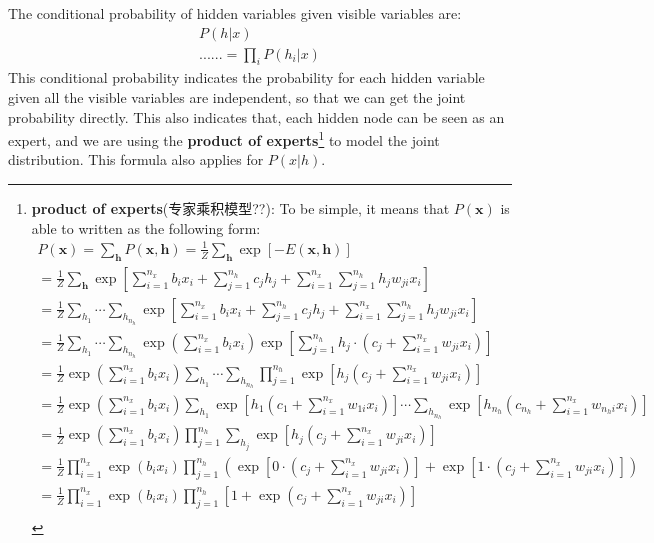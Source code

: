 \documentclass[11pt,fleqn, UTF8]{ctexbook} %
\begin{document}
The conditional probability of hidden variables given visible variables are:
\begin{gather*}
  P(h\vert x) \\
  ......=\prod_iP(h_i\vert x)
\end{gather*}
This conditional probability indicates the probability for each hidden variable given all the visible variables are independent, so that we can get the joint probability directly. This also indicates that, each hidden node can be seen as an expert, and we are using the \textbf{product of experts}\footnote{
\textbf{product of experts}(专家乘积模型??): To be simple, it means that $P(\boldsymbol{x})$ is able to written as the following form\cite{hinton2002training,welling2007product}:
\begin{gather*}
  P(\boldsymbol{x})=\sum_{\boldsymbol{h}}P(\boldsymbol{x},\boldsymbol{h})=\frac{1}{Z}\sum_{\boldsymbol{h}}\exp[-E(\boldsymbol{x},\boldsymbol{h})]\\
  =\frac{1}{Z}\sum_{\boldsymbol{h}}\exp[\sum_{i=1}^{n_x}b_ix_i+\sum_{j=1}^{n_h}c_jh_j+\sum_{i=1}^{n_x}\sum_{j=1}^{n_h}h_jw_{ji}x_i]\\
  =\frac{1}{Z}\sum_{h_1}\cdots\sum_{h_{n_h}}\exp[\sum_{i=1}^{n_x}b_ix_i+\sum_{j=1}^{n_h}c_jh_j+\sum_{i=1}^{n_x}\sum_{j=1}^{n_h}h_jw_{ji}x_i]\\
  =\frac{1}{Z}\sum_{h_1}\cdots\sum_{h_{n_h}}\exp(\sum_{i=1}^{n_x}b_ix_i)\exp[\sum_{j=1}^{n_h}h_j\cdot(c_j+\sum_{i=1}^{n_x}w_{ji}x_i)]\\
  =\frac{1}{Z}\exp(\sum_{i=1}^{n_x}b_ix_i)\sum_{h_1}\cdots\sum_{h_{n_h}}\prod_{j=1}^{n_h}\exp[h_j(c_j+\sum_{i=1}^{n_x}w_{ji}x_i)]\\
  =\frac{1}{Z}\exp(\sum_{i=1}^{n_x}b_ix_i)\sum_{h_1}\exp[h_1(c_1+\sum_{i=1}^{n_x}w_{1i}x_i)]\cdots\sum_{h_{n_h}}\exp[h_{n_h}(c_{n_h}+\sum_{i=1}^{n_x}w_{n_hi}x_i)]\\
  =\frac{1}{Z}\exp(\sum_{i=1}^{n_x}b_ix_i)\prod_{j=1}^{n_h}\sum_{h_j}\exp[h_j(c_j+\sum_{i=1}^{n_x}w_{ji}x_i)]\\
  =\frac{1}{Z}\prod_{i=1}^{n_x}\exp(b_ix_i)\prod_{j=1}^{n_h}\left(\exp[0\cdot(c_j+\sum_{i=1}^{n_x}w_{ji}x_i)]+\exp[1\cdot(c_j+\sum_{i=1}^{n_x}w_{ji}x_i)]\right)\\
  =\frac{1}{Z}\prod_{i=1}^{n_x}\exp(b_ix_i)\prod_{j=1}^{n_h}[1+\exp(c_j+\sum_{i=1}^{n_x}w_{ji}x_i)]\\
\end{gather*}
} to model the joint distribution. This formula also applies for $P(x\vert h)$.
\end{document}
